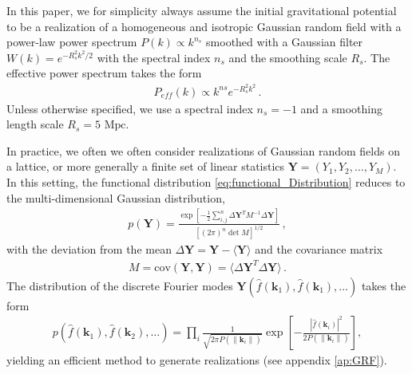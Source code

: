 \documentclass[a4paper, 11pt]{article}
\begin{document}
In this paper, we for simplicity always assume the initial gravitational potential to be a realization of a homogeneous and isotropic Gaussian random field with a power-law power spectrum $P(k) \propto k^{n_s}$ smoothed with a Gaussian filter $W(k)=e^{-R_s^2 k^2/2}$ with the spectral index $n_s$ and the smoothing scale $R_s$. The effective power spectrum takes the form 
\begin{align}
P_{eff}(k)\propto k^{ns}e^{-R_s^2 k^2}\,.
\end{align}
Unless otherwise specified, we use a spectral index $n_s=-1$ and a smoothing length scale $R_s = 5\text{ Mpc}$. 



In practice, we often we often consider realizations of Gaussian random fields on a lattice, or more generally a finite set of linear statistics $\bm{Y}=(Y_1,Y_2,\dots,Y_M)$. In this setting, the functional distribution \eqref{eq:functional_Distribution} reduces to the multi-dimensional Gaussian distribution,
\begin{align}
p(\bm{Y}) = \frac{\exp\left[-\frac{1}{2} \sum_{i,j}^n \Delta \bm{Y}^T M^{-1} \Delta \bm{Y}\right]}{[(2\pi)^n \det M]^{1/2}}\,,
\end{align}
with the deviation from the mean $\Delta \bm{Y} = \bm{Y} - \langle \bm{Y}\rangle$ and the covariance matrix
\begin{align}
M = \text{cov}(\bm{Y},\bm{Y}) = \langle \Delta \bm{Y}^T \Delta \bm{Y}\rangle\,.
\end{align}
The distribution of the discrete Fourier modes $\bm{Y}(\hat{f}(\bm{k}_1),\hat{f}(\bm{k}_1),\dots)$ takes the form 
\begin{align}
p(\hat{f}(\bm{k}_1), \hat{f}(\bm{k}_2), \dots) = \prod_{i} \frac{1}{\sqrt{2\pi P(\| \bm{k}_i\|)}} \exp\left[-\frac{|\hat{f}(\bm{k}_i)|^2}{2P(\|\bm{k}_i\|)}\right],
\end{align}
yielding an efficient method to generate realizations (see appendix \ref{ap:GRF}).
\end{document}
